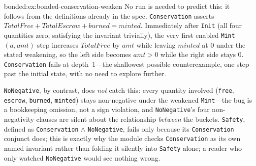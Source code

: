 \begin{pdSolution}{bonded:ex:bonded-conservation-weaken}
No run is needed to predict this: it follows from the definitions already in the spec. \texttt{Conservation} asserts $\mathit{TotalFree} + \mathit{TotalEscrow} + \mathit{burned} = \mathit{minted}$. Immediately after \texttt{Init} (all four quantities zero, satisfying the invariant trivially), the very first enabled \texttt{Mint}$(a, \mathit{amt})$ step increases $\mathit{TotalFree}$ by $\mathit{amt}$ while leaving $\mathit{minted}$ at $0$ under the stated weakening, so the left side becomes $\mathit{amt} > 0$ while the right side stays $0$. \texttt{Conservation} fails at depth~$1$---the shallowest possible counterexample, one step past the initial state, with no need to explore further.

\texttt{NoNegative}, by contrast, does \emph{not} catch this: every quantity involved (\texttt{free}, \texttt{escrow}, \texttt{burned}, \texttt{minted}) stays non-negative under the weakened \texttt{Mint}---the bug is a bookkeeping omission, not a sign violation, and \texttt{NoNegative}'s four non-negativity clauses are silent about the relationship \emph{between} the buckets. \texttt{Safety}, defined as \texttt{Conservation} $\wedge$ \texttt{NoNegative}, fails only because its \texttt{Conservation} conjunct does; this is exactly why the module checks \texttt{Conservation} as its own named invariant rather than folding it silently into \texttt{Safety} alone; a reader who only watched \texttt{NoNegative} would see nothing wrong.
\end{pdSolution}
